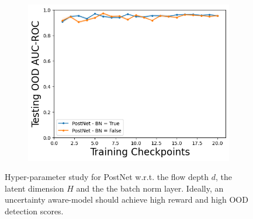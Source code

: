 \begin{figure}
\begin{subfigure}{.3\textwidth}
        \includegraphics[width=\textwidth]{sections/011_icml2022/resources/CartPoleOOD-v0-AUC-ROC-epistemic_-testing-hyperparameter-bn-postnet.png}
    \end{subfigure}        
    \vspace{-3mm}
    \caption{Hyper-parameter study for PostNet w.r.t. the flow depth $d$, the latent dimension $H$ and the the batch norm layer. Ideally, an uncertainty aware-model should achieve high reward and high OOD detection scores.}
    \label{fig:hyperparameter-postnet-cartpole}
    \vspace{-4mm}
\end{figure}